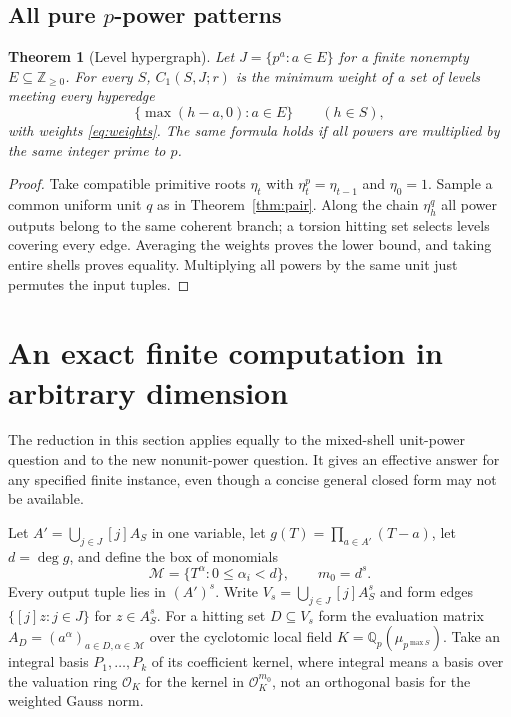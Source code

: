 \documentclass[11pt]{article}
\newtheorem{theorem}{Theorem}[section]
\theoremstyle{definition}
\newcommand{\Qp}{\mathbb Q_p}
\newcommand{\OO}{\mathcal O}
\newcommand{\Z}{\mathbb Z}
\begin{document}
\subsection{All pure $p$-power patterns}
\begin{theorem}[Level hypergraph]\label{thm:levels}
Let $J=\{p^a:a\in E\}$ for a finite nonempty $E\subseteq\Z_{\ge0}$. For every $S$, $C_1(S,J;r)$ is the minimum weight of a set of levels meeting every hyperedge
\[
 \{\max(h-a,0):a\in E\}\qquad(h\in S),
\]
with weights \eqref{eq:weights}. The same formula holds if all powers are multiplied by the same integer prime to $p$.
\end{theorem}
\begin{proof}
Take compatible primitive roots $\eta_t$ with $\eta_t^p=\eta_{t-1}$ and $\eta_0=1$. Sample a common uniform unit $q$ as in Theorem~\ref{thm:pair}. Along the chain $\eta_h^q$ all power outputs belong to the same coherent branch; a torsion hitting set selects levels covering every edge. Averaging the weights proves the lower bound, and taking entire shells proves equality. Multiplying all powers by the same unit just permutes the input tuples.
\end{proof}

\section{An exact finite computation in arbitrary dimension}\label{sec:finite}

The reduction in this section applies equally to the mixed-shell unit-power question and to the new nonunit-power question. It gives an effective answer for any specified finite instance, even though a concise general closed form may not be available.

Let $A'=\bigcup_{j\in J}[j]A_S$ in one variable, let $g(T)=\prod_{a\in A'}(T-a)$, let $d=\deg g$, and define the box of monomials
\[
 \mathcal M=\{T^\alpha:0\le\alpha_i<d\},\qquad m_0=d^s.
\]
Every output tuple lies in $(A')^s$. Write $V_s=\bigcup_{j\in J}[j]A_S^s$ and form edges $\{[j]z:j\in J\}$ for $z\in A_S^s$. For a hitting set $D\subseteq V_s$ form the evaluation matrix $A_D=(a^\alpha)_{a\in D,\alpha\in\mathcal M}$ over the cyclotomic local field $K=\Qp(\mu_{p^{\max S}})$. Take an integral basis $P_1,\dots,P_k$ of its coefficient kernel, where integral means a basis over the valuation ring $\OO_K$ for the kernel in $\OO_K^{m_0}$, not an orthogonal basis for the weighted Gauss norm.
\end{document}
